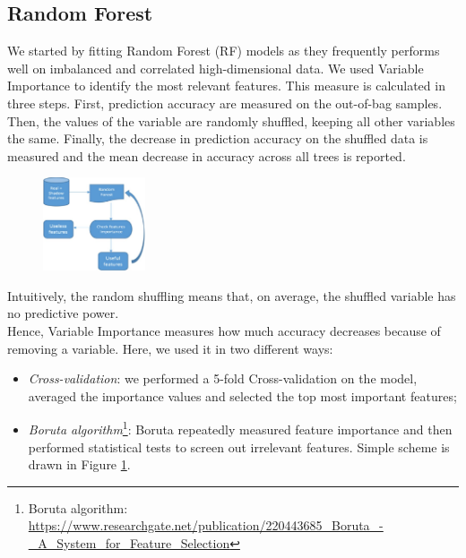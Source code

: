 \documentclass[a4paper,11pt, oneside]{article}  %
\begin{document}
\subsection{Random Forest}
We started by fitting Random Forest (RF) models as they frequently performs well on imbalanced and correlated high-dimensional data. We used Variable Importance to identify the most relevant features. This measure is calculated in three steps. First, prediction accuracy are measured on the out-of-bag samples. Then, the values of the variable are randomly shuffled, keeping all other variables the same. Finally, the decrease in prediction accuracy on the shuffled data is measured and the mean decrease in accuracy across all trees is reported. 

\begin{figure}
	\includegraphics[width=0.27\textwidth]{Boruta-Algorithm.jpg}
	\label{fig2}
\end{figure}
Intuitively, the random shuffling means that, on average, the shuffled variable has no predictive power. \\
Hence, Variable Importance measures how much accuracy decreases because of removing a variable. Here, we used it in two different ways:
\begin{itemize}
	\item \textit{Cross-validation}: we performed a 5-fold Cross-validation on the model, averaged the importance values and selected the top most important features;
	\item \textit{Boruta algorithm}\footnote{Boruta algorithm: \url{https://www.researchgate.net/publication/220443685_Boruta_-_A_System_for_Feature_Selection}}: Boruta repeatedly measured feature importance and then performed statistical tests to screen out irrelevant features. Simple scheme is drawn in Figure \ref{fig2}. %
\end{itemize} 
\end{document}
